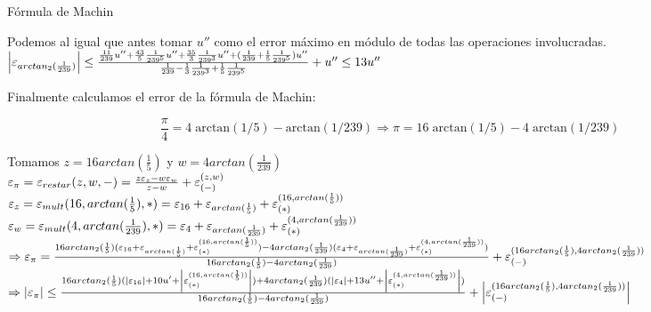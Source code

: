 \begin{subsection}{Fórmula de Machin}
	\pa
	
	Podemos al igual que antes tomar $u''$ como el error máximo en módulo de todas las operaciones involucradas.\\
	
	$\left|\varepsilon _{arctan_2(\frac{1}{239})}\right| \leq \frac{\frac{11}{239}u'' + \frac{43}{5}\frac{1}{239^5}u'' + \frac{35}{3}\frac{1}{239^3}u'' + (\frac{1}{239}+\frac{1}{5}\frac{1}{239^5})u''}{\frac{1}{239}-\frac{1}{3}\frac{1}{239^3}+\frac{1}{5}\frac{1}{239^5}} + u'' \leq 13u''$\\
	
	\pa
	
	Finalmente calculamos el error de la fórmula de Machin:
	
	\begin{equation*}
		\frac{\pi}{4} = 4 \; \mathrm{arctan}(1/5) - \mathrm{arctan}(1/239) \Rightarrow \pi = 16 \; \mathrm{arctan}(1/5) - 4 \; \mathrm{arctan}(1/239)
    \end{equation*}
	
	Tomamos $z=16arctan(\frac{1}{5})$ y $w=4arctan(\frac{1}{239})$\\
	
	$\varepsilon _{\pi} = \varepsilon _{restar}({z,w,-}) = \frac{z\varepsilon _{z} - w\varepsilon _{w}}{z-w} + \varepsilon _{({-})}^{({z,w})}$\\
	
	$\varepsilon _{z} = \varepsilon _{mult}({16,arctan(\frac{1}{5}),*}) = \varepsilon _{16} + \varepsilon _{arctan(\frac{1}{5})} + \varepsilon _{({*})}^{({16,arctan(\frac{1}{5})})}$\\
	
	$\varepsilon _{w} = \varepsilon _{mult}({4,arctan(\frac{1}{239}),*}) = \varepsilon _{4} + \varepsilon _{arctan(\frac{1}{239})} + \varepsilon _{({*})}^{({4,arctan(\frac{1}{239})})}$\\
	
	$\Rightarrow \varepsilon _{\pi} = \frac{16arctan_2(\frac{1}{5})(\varepsilon _{16} + \varepsilon _{arctan(\frac{1}{5})} + \varepsilon _{({*})}^{({16,arctan(\frac{1}{5})})}) - 4arctan_2(\frac{1}{239})(\varepsilon _{4} + \varepsilon _{arctan(\frac{1}{239})} + \varepsilon _{({*})}^{({4,arctan(\frac{1}{239})})})}{16arctan_2(\frac{1}{5})-4arctan_2(\frac{1}{239})} + \varepsilon _{({-})}^{({16arctan_2(\frac{1}{5}),4arctan_2(\frac{1}{239})})}$\\
	
	$\Rightarrow \left|\varepsilon _{\pi}\right| \leq \frac{16arctan_2(\frac{1}{5})(|\varepsilon _{16}| + 10u' + \left|\varepsilon _{({*})}^{({16,arctan(\frac{1}{5})})}\right|) + 4arctan_2(\frac{1}{239})(|\varepsilon _{4}| + 13u'' + \left|\varepsilon _{({*})}^{({4,arctan(\frac{1}{239})})}\right|)}{16arctan_2(\frac{1}{5})-4arctan_2(\frac{1}{239})} + \left|\varepsilon _{({-})}^{({16arctan_2(\frac{1}{5}),4arctan_2(\frac{1}{239})})}\right|$\\
	

\end{subsection}
